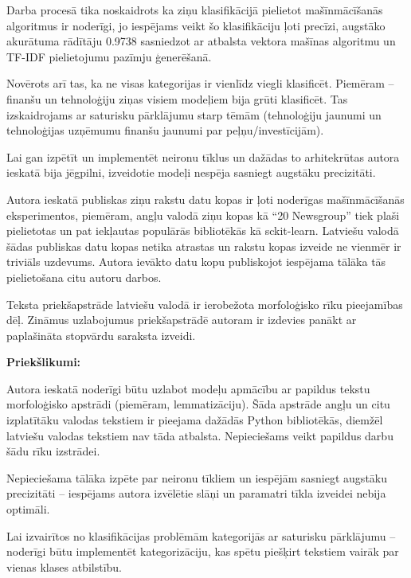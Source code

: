 Darba procesā tika noskaidrots ka ziņu klasifikācijā pielietot mašīnmācīšanās algoritmus ir noderīgi, jo iespējams veikt šo klasifikāciju ļoti precīzi, augstāko akurātuma rādītāju 0.9738 sasniedzot ar atbalsta vektora mašīnas algoritmu un TF-IDF pielietojumu pazīmju ģenerēšanā.

Novērots arī tas, ka ne visas kategorijas ir vienlīdz viegli klasificēt. Piemēram – finanšu un tehnoloģiju ziņas visiem modeļiem bija grūti klasificēt. Tas izskaidrojams ar saturisku pārklājumu starp tēmām (tehnoloģiju jaunumi un tehnoloģijas uzņēmumu finanšu jaunumi par peļņu/investīcijām).

Lai gan izpētīt un implementēt neironu tīklus un dažādas to arhitekrūtas autora ieskatā bija jēgpilni, izveidotie modeļi nespēja sasniegt augstāku precizitāti.

Autora ieskatā publiskas ziņu rakstu datu kopas ir ļoti noderīgas mašīnmācīšanās eksperimentos, piemēram, angļu valodā ziņu kopas kā “20 Newsgroup” tiek plaši pielietotas un pat iekļautas populārās bibliotēkās kā sckit-learn. Latviešu valodā šādas publiskas datu kopas netika atrastas un rakstu kopas izveide ne vienmēr ir triviāls uzdevums. Autora ievākto datu kopu publiskojot iespējama tālāka tās pielietošana citu autoru darbos.

Teksta priekšapstrāde latviešu valodā ir ierobežota morfoloģisko rīku pieejamības dēļ. Zināmus uzlabojumus priekšapstrādē autoram ir izdevies panākt ar paplašināta stopvārdu saraksta izveidi.

\textbf {Priekšlikumi:}

Autora ieskatā noderīgi būtu uzlabot modeļu apmācību ar papildus tekstu morfoloģisko apstrādi (piemēram, lemmatizāciju). Šāda apstrāde angļu un citu izplatītāku valodas tekstiem ir pieejama dažādās Python bibliotēkās, diemžēl latviešu valodas tekstiem nav tāda atbalsta. Nepieciešams veikt papildus darbu šādu rīku izstrādei.

Nepieciešama tālāka izpēte par neironu tīkliem un iespējām sasniegt augstāku precizitāti – iespējams autora izvēlētie slāņi un paramatri tīkla izveidei nebija optimāli.

Lai izvairītos no klasifikācijas problēmām kategorijās ar saturisku pārklājumu – noderīgi būtu implementēt kategorizāciju, kas spētu piešķirt tekstiem vairāk par vienas klases atbilstību. 